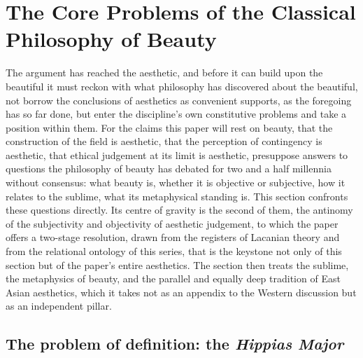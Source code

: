 \section{The Core Problems of the Classical Philosophy of Beauty}
\label{p21:sec:aesthetics-problems}

\noindent
The argument has reached the aesthetic, and before it can build upon the beautiful it must reckon with what philosophy has discovered about the beautiful, not borrow the conclusions of aesthetics as convenient supports, as the foregoing has so far done, but enter the discipline's own constitutive problems and take a position within them. For the claims this paper will rest on beauty, that the construction of the field is aesthetic, that the perception of contingency is aesthetic, that ethical judgement at its limit is aesthetic, presuppose answers to questions the philosophy of beauty has debated for two and a half millennia without consensus: what beauty is, whether it is objective or subjective, how it relates to the sublime, what its metaphysical standing is. This section confronts these questions directly. Its centre of gravity is the second of them, the antinomy of the subjectivity and objectivity of aesthetic judgement, to which the paper offers a two-stage resolution, drawn from the registers of Lacanian theory and from the relational ontology of this series, that is the keystone not only of this section but of the paper's entire aesthetics. The section then treats the sublime, the metaphysics of beauty, and the parallel and equally deep tradition of East Asian aesthetics, which it takes not as an appendix to the Western discussion but as an independent pillar.

\subsection{The problem of definition: the \texorpdfstring{\emph{Hippias Major}}{Hippias Major}}
\label{p21:sub:ap-definition}

